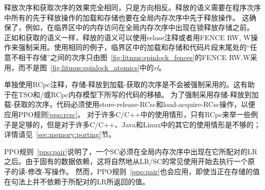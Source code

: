 释放次序和获取次序的效果完全相同，只是方向相反。释放的语义需要在程序次序中所有的先于释放操作的加载和存储也要在全局内存次序中先于释放操作。
这确保了，例如，在临界区中的内存访问在全局内存次序中出现在锁释放存储之前。
正如和获取的语义一样，释放的语义可以使用relase注释或者用FENCE RW, W操作来强制采用。使用相同的例子，临界区中的加载和存储和代码片段末尾处的“任意不相干存储”之间的次序只由图~\ref{fig:litmus:spinlock_fences}的FENCE RW,W采用，而不是图~\ref{fig:litmus:spinlock_atomics}中的{\em rl}。

单独使用RCpc注释，存储-释放到加载-获取的次序是不会被强制采用的。这有助于在TSO和/或RCpc内存模型下所写的代码的移植。
为了强制采用存储-释放到加载-获取的次序，代码必须使用store-release-RCsc和load-acquire-RCsc操作，以便应用PPO规则\ref{ppo:rcsc}。
对于许多C/C++中的使用情形，只有RCpc来举一些例子是足够的，但是对于许多C/C++、Java和Linux中的其它的使用情形是不够的；详情请见~\ref{sec:memory:porting}节。

PPO规则~\ref{ppo:pair}说明了，一个SC必须在全局内存次序中出现在它所配对的LR之后。由于固有的数据依赖，这将自然地从LR/SC的常见使用开始去执行一个原子的读-修改-写操作。
然而，PPO规则~\ref{ppo:pair}也会应用，即使当正在存储的值在句法上并不依赖于所配对的LR所返回的值。

